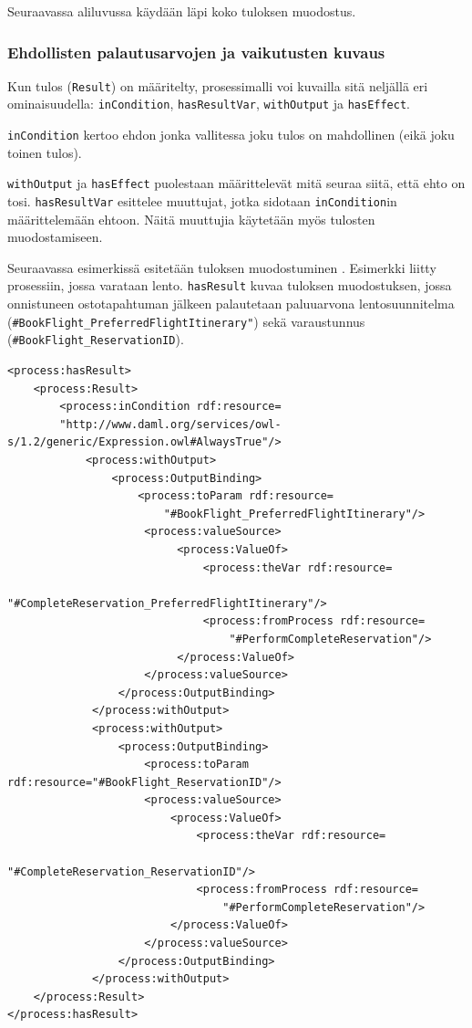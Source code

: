 \documentclass[finnish]{tktltiki2}
\theoremstyle{definition}
\theoremstyle{remark}
\begin{document}
Seuraavassa aliluvussa käydään läpi koko tuloksen muodostus.

\subsubsection{Ehdollisten palautusarvojen ja vaikutusten kuvaus}

Kun tulos (\texttt{Result}) on määritelty, prosessimalli voi kuvailla sitä neljällä eri ominaisuudella\cite{OWLS}: \texttt{inCondition}, \texttt{hasResultVar}, \texttt{withOutput} ja \texttt{hasEffect}\cite{OWLS}.  

\texttt{inCondition} kertoo ehdon jonka vallitessa joku tulos on mahdollinen (eikä joku toinen tulos). 

\texttt{withOutput} ja \texttt{hasEffect} puolestaan määrittelevät mitä seuraa siitä, että ehto on tosi. \texttt{hasResultVar} esittelee muuttujat, jotka sidotaan \texttt{inCondition}in määrittelemään ehtoon.  Näitä muuttujia käytetään myös tulosten muodostamiseen\cite{OWLS}. 

Seuraavassa esimerkissä esitetään tuloksen muodostuminen \cite{daml}. Esimerkki liitty prosessiin, jossa varataan lento. \texttt{hasResult} kuvaa tuloksen muodostuksen, jossa onnistuneen ostotapahtuman jälkeen palautetaan paluuarvona lentosuunnitelma (\texttt{\#BookFlight\_PreferredFlightItinerary"}) sekä varaustunnus (\texttt{\#BookFlight\_ReservationID}). 

\begin{verbatim}
<process:hasResult>
    <process:Result>
        <process:inCondition rdf:resource=
        "http://www.daml.org/services/owl-s/1.2/generic/Expression.owl#AlwaysTrue"/>
            <process:withOutput>
                <process:OutputBinding>
                    <process:toParam rdf:resource=
                        "#BookFlight_PreferredFlightItinerary"/>
                     <process:valueSource>
                          <process:ValueOf>
                              <process:theVar rdf:resource=
                                  "#CompleteReservation_PreferredFlightItinerary"/>
                              <process:fromProcess rdf:resource=
                                  "#PerformCompleteReservation"/>
                          </process:ValueOf>
                     </process:valueSource>
                 </process:OutputBinding>
             </process:withOutput>
             <process:withOutput>
                 <process:OutputBinding>
                     <process:toParam rdf:resource="#BookFlight_ReservationID"/>
                     <process:valueSource>
                         <process:ValueOf>
                             <process:theVar rdf:resource=
                                 "#CompleteReservation_ReservationID"/>
                             <process:fromProcess rdf:resource=
                                 "#PerformCompleteReservation"/>
                         </process:ValueOf>
                     </process:valueSource>
                 </process:OutputBinding>
             </process:withOutput>
    </process:Result>
</process:hasResult>
\end{verbatim}
\end{document}
